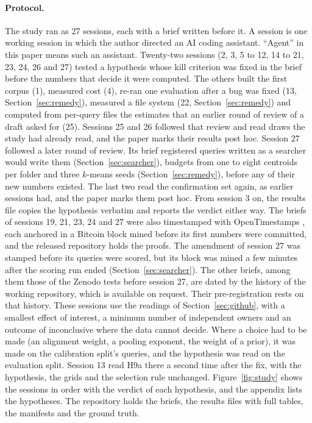 \documentclass[11pt]{article}
\begin{document}
\paragraph{Protocol.} The study ran as 27 sessions, each with a brief written before it. A session is one working session in which the author directed an AI coding assistant. ``Agent'' in this paper means such an assistant. Twenty-two sessions (2, 3, 5 to 12, 14 to 21, 23, 24, 26 and 27) tested a hypothesis whose kill criterion was fixed in the brief before the numbers that decide it were computed. The others built the first corpus (1), measured cost (4), re-ran one evaluation after a bug was fixed (13, Section~\ref{sec:remedy}), measured a file system (22, Section~\ref{sec:remedy}) and computed from per-query files the estimates that an earlier round of review of a draft asked for (25). Sessions 25 and 26 followed that review and read draws the study had already read, and the paper marks their results post hoc. Session 27 followed a later round of review. Its brief registered queries written as a searcher would write them (Section~\ref{sec:searcher}), budgets from one to eight centroids per folder and three $k$-means seeds (Section~\ref{sec:remedy}), before any of their new numbers existed. The last two read the confirmation set again, as earlier sessions had, and the paper marks them post hoc. From session 3 on, the results file copies the hypothesis verbatim and reports the verdict either way. The briefs of sessions 19, 21, 23, 24 and 27 were also timestamped with OpenTimestamps \citep{todd2016opentimestamps}, each anchored in a Bitcoin block mined before its first numbers were committed, and the released repository holds the proofs. The amendment of session 27 was stamped before its queries were scored, but its block was mined a few minutes after the scoring run ended (Section~\ref{sec:searcher}). The other briefs, among them those of the Zenodo tests before session 27, are dated by the history of the working repository, which is available on request. Their pre-registration rests on that history. These sessions use the readings of Section~\ref{sec:github}, with a smallest effect of interest, a minimum number of independent owners and an outcome of inconclusive where the data cannot decide. Where a choice had to be made (an alignment weight, a pooling exponent, the weight of a prior), it was made on the calibration split's queries, and the hypothesis was read on the evaluation split. Session 13 read H9a there a second time after the fix, with the hypothesis, the grids and the selection rule unchanged. Figure~\ref{fig:study} shows the sessions in order with the verdict of each hypothesis, and the appendix lists the hypotheses. The repository holds the briefs, the results files with full tables, the manifests and the ground truth.
\end{document}
